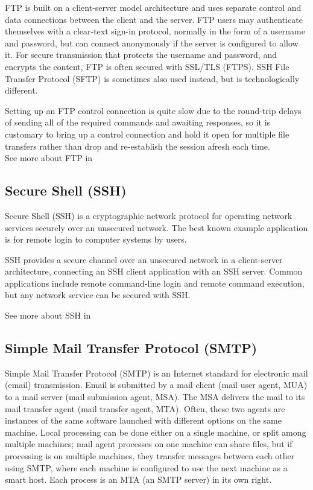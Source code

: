 FTP is built on a client-server model architecture and uses separate control and data connections between the client and the server. FTP users may authenticate themselves with a clear-text sign-in protocol, normally in the form of a username and password, but can connect anonymously if the server is configured to allow it. For secure transmission that protects the username and password, and encrypts the content, FTP is often secured with SSL/TLS (FTPS). SSH File Transfer Protocol (SFTP) is sometimes also used instead, but is technologically different.

Setting up an FTP control connection is quite slow due to the round-trip delays of sending all of the required commands and awaiting responses, so it is customary to bring up a control connection and hold it open for multiple file transfers rather than drop and re-establish the session afresh each time. \\
See more about FTP in\cite{FTP}

\subsection{Secure Shell (SSH)} 
Secure Shell (SSH) is a cryptographic network protocol for operating network services securely over an unsecured network. The best known example application is for remote login to computer systems by users.

SSH provides a secure channel over an unsecured network in a client-server architecture, connecting an SSH client application with an SSH server. Common applications include remote command-line login and remote command execution, but any network service can be secured with SSH. 

See more about SSH in \cite{SSH}

\subsection{Simple Mail Transfer Protocol (SMTP)} 
Simple Mail Transfer Protocol (SMTP) is an Internet standard for electronic mail (email) transmission. Email is submitted by a mail client (mail user agent, MUA) to a mail server (mail submission agent, MSA). The MSA delivers the mail to its mail transfer agent (mail transfer agent, MTA). Often, these two agents are instances of the same software launched with different options on the same machine. Local processing can be done either on a single machine, or split among multiple machines; mail agent processes on one machine can share files, but if processing is on multiple machines, they transfer messages between each other using SMTP, where each machine is configured to use the next machine as a smart host. Each process is an MTA (an SMTP server) in its own right.

